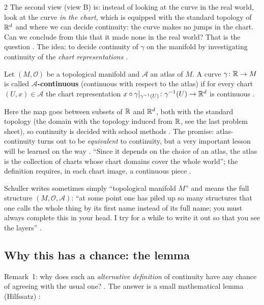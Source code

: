 \begin{paracol}{2}
The second view (view B) is: instead of looking at the curve in the real world, look at the curve \emph{in the chart}, which is
equipped with the standard topology of $\mathbb{R}^d$ and where we can decide continuity: the curve makes no jumps in the chart.
Can we conclude from this that it made none in the real world? That is the question .
The idea: to decide continuity of $\gamma$ on the manifold by investigating continuity of the \emph{chart representations}
.

\begin{definition}\label{def:dm-atlascont}
Let $(M,\mathcal O)$ be a topological manifold and $\mathcal A$ an atlas of $M$. A curve $\gamma\colon\mathbb{R}\to M$ is called
\textbf{$\mathcal A$-continuous} (continuous with respect to the atlas) if for every chart $(U,x)\in\mathcal A$ the chart
representation $x\circ\gamma|_{\gamma^{-1}(U)}\colon\gamma^{-1}(U)\to\mathbb{R}^d$ is continuous
.
\end{definition}
Here the map goes between subsets of $\mathbb{R}$ and $\mathbb{R}^d$, both with the standard topology (the domain with the topology induced
from $\mathbb{R}$, see the last problem sheet), so continuity is decided with school methods .
The promise: atlas-continuity turns out to be \emph{equivalent} to continuity, but a very important lesson will be
learned on the way . ``Since it depends on the choice of an atlas, the atlas is the collection of
charts whose chart domains cover the whole world''; the definition requires, in each chart image, a continuous piece
.

\begin{aside}
Schuller writes sometimes simply ``topological manifold $M$'' and means the full structure $(M,\mathcal O,\mathcal A)$:
``at some point one has piled up so many structures that one calls the whole thing by its first name instead of its full
name; you must always complete this in your head. I try for a while to write it out so that you see the layers''
.
\end{aside}

\subsection{Why this has a chance: the lemma}\label{ssec:dm-lemma}

Remark~1: why does such an \emph{alternative definition} of continuity have any chance of agreeing with the usual one?
. The answer is a small mathematical lemma (Hilfssatz) :


\end{paracol}
